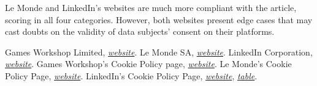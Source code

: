 \documentclass[twocolumn, letterpaper]{scrartcl}
\begin{document}
	Le Monde and LinkedIn's websites are much more compliant with the article, scoring in all four categories. However, both websites present edge cases that may cast doubts on the validity of data subjects' consent on their platforms.
	
       
    \begin{thebibliography}{9}

    	Games Workshop Limited, \textit{\href{https://www.games-workshop.com/en-US/Home}{website}}.
    	Le Monde SA, \textit{\href{https://www.lemonde.fr/}{website}}.
    	LinkedIn Corporation, \textit{\href{https://www.linkedin.com/}{website}}.
    	Games Workshop's Cookie Policy page, \textit{\href{https://www.games-workshop.com/en-EU/Cookie-Notice}{website}}.
    	Le Monde's Cookie Policy Page, \textit{\href{https://www.lemonde.fr/confidentialite/}{website}}.
    	LinkedIn's Cookie Policy Page, \textit{\href{https://www.linkedin.com/legal/cookie-policy}{website}}, \textit{\href{https://www.linkedin.com/legal/l/cookie-table}{table}}.
    	
    \end{thebibliography}
\end{document}

